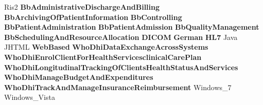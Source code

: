 \documentclass[aspectratio=1610]{beamer}
\begin{document}
\begin{frame}{Ris2}
\textbf{BbAdministrativeDischargeAndBilling}
\textbf{BbArchivingOfPatientInformation}
\textbf{BbControlling}
\textbf{BbPatientAdministration}
\textbf{BbPatientAdmission}
\textbf{BbQualityManagement}
\textbf{BbSchedulingAndResourceAllocation}
\textbf{DICOM}
\textbf{German}
\textbf{HL7}
Java
JHTML
\textbf{WebBased}
\textbf{WhoDhiDataExchangeAcrossSystems}
\textbf{WhoDhiEnrolClientForHealthServicesclinicalCarePlan}
\textbf{WhoDhiLongitudinalTrackingOfClientsHealthStatusAndServices}
\textbf{WhoDhiManageBudgetAndExpenditures}
\textbf{WhoDhiTrackAndManageInsuranceReimbursement}
Windows\_7
Windows\_Vista
\end{frame}

\iffalse

\fi
\end{document}
